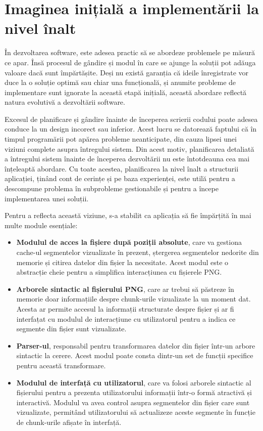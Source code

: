\documentclass[a4paper,12pt]{report}
\begin{document}
\section{Imaginea inițială a implementării la nivel înalt}

În dezvoltarea software, este adesea practic să se abordeze problemele pe măsură ce apar.
Însă procesul de gândire și modul în care se ajunge la soluții
pot adăuga valoare dacă sunt împărtășite.
Deși nu există garanția că ideile înregistrate vor duce
la o soluție optimă sau chiar una funcțională,
și anumite probleme de implementare sunt ignorate la această etapă inițială,
această abordare reflectă natura evolutivă a dezvoltării software.

Excesul de planificare și gândire înainte de începerea scrierii codului
poate adesea conduce la un design incorect sau inferior.
Acest lucru se datorează faptului că în timpul programării pot apărea probleme neanticipate,
din cauza lipsei unei viziuni complete asupra întregului sistem.
Din acest motiv, planificarea detaliată a întregului sistem înainte de începerea dezvoltării
nu este întotdeauna cea mai înțeleaptă abordare.
Cu toate acestea, planificarea la nivel înalt a structurii aplicației,
ținând cont de cerințe și pe baza experienței,
este utilă pentru a descompune problema în subprobleme gestionabile
și pentru a începe implementarea unei soluții.

Pentru a reflecta această viziune, s-a stabilit ca aplicația
să fie împărțită în mai multe module esențiale:
\begin{itemize}
  \item 
  \textbf{Modulul de acces la fișiere după poziții absolute},
  care va gestiona cache-ul segmentelor vizualizate în prezent,
  ștergerea segmentelor nedorite din memorie și citirea datelor din fișier la necesitate.
  Acest modul este o abstracție cheie pentru a simplifica interacțiunea cu fișierele \ac{PNG}.

  \item
  \textbf{Arborele sintactic al fișierului \ac{PNG}},
  care ar trebui să păstreze în memorie doar informațiile despre
  chunk-urile vizualizate la un moment dat.
  Acesta ar permite accesul la informații structurate despre fișier
  și ar fi interfațat cu modulul de interacțiune cu utilizatorul
  pentru a indica ce segmente din fișier sunt vizualizate.

  \item
  \textbf{Parser-ul}, responsabil pentru transformarea datelor
  din fișier într-un arbore sintactic la cerere.
  Acest modul poate consta dintr-un set de funcții specifice pentru această transformare.

  \item
  \textbf{Modulul de interfață cu utilizatorul},
  care va folosi arborele sintactic al fișierului pentru
  a prezenta utilizatorului informații într-o formă atractivă și interactivă.
  Modulul va avea control asupra segmentelor din fișier care sunt vizualizate,
  permitând utilizatorului să actualizeze aceste segmente
  în funcție de chunk-urile afișate în interfață.
\end{itemize}
\end{document}
